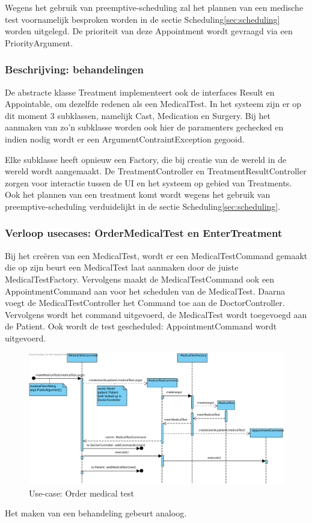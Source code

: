\documentclass[a4paper]{article}
\begin{document}
Wegens het gebruik van preemptive-scheduling zal het plannen van een medische test voornamelijk besproken worden in de sectie Scheduling\ref{sec:scheduling} worden uitgelegd. De prioriteit van deze Appointment wordt gevraagd via een PriorityArgument.

\subsubsection{Beschrijving: behandelingen}
De abstracte klasse Treatment implementeert ook de interfaces Result en Appointable, om dezelfde redenen als een MedicalTest. In het systeem zijn er op dit moment 3 subklassen, namelijk Cast, Medication en Surgery. Bij het aanmaken van zo'n subklasse worden ook hier de paramenters gechecked en indien nodig wordt er een ArgumentContraintException gegooid.

Elke subklasse heeft opnieuw een Factory, die bij creatie van de wereld in de wereld wordt aangemaakt. De TreatmentController en TreatmentResultController zorgen voor interactie tussen de UI en het systeem op gebied van Treatments. Ook het plannen van een treatment komt wordt wegens het gebruik van preemptive-scheduling verduidelijkt in de sectie Scheduling\ref{sec:scheduling}.

\subsubsection{Verloop usecases: OrderMedicalTest en EnterTreatment}
Bij het cre\"eren van een MedicalTest, wordt er een MedicalTestCommand gemaakt die op zijn beurt een MedicalTest laat aanmaken door de juiste MedicalTestFactory. Vervolgens maakt de MedicalTestCommand ook een AppointmentCommand aan voor het schedulen van de MedicalTest. Daarna voegt de MedicalTestController het Command toe aan de DoctorController. Vervolgens wordt het command uitgevoerd, de MedicalTest wordt toegevoegd aan de Patient. Ook wordt de test gescheduled: AppointmentCommand wordt uitgevoerd.
\begin{figure}[h]
\centering
\includegraphics[width=\textwidth]{Pictures/OrderMedicalTest.pdf}
\caption{Use-case: Order medical test}
\label{fig:ordermedicaltest}
\end{figure}
Het maken van een behandeling gebeurt analoog.
\end{document}
